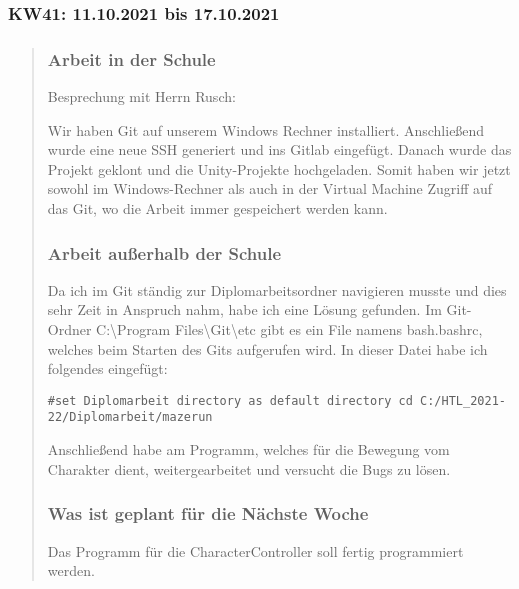 

\subsubsection{KW41: 11.10.2021 bis 17.10.2021}

\begin{quote}
	\subsubsection*{Arbeit in der Schule}
	
	Besprechung mit Herrn Rusch:
	
	Wir haben Git auf unserem Windows Rechner installiert. Anschließend
	wurde eine neue SSH generiert und ins Gitlab eingefügt. Danach wurde das
	Projekt geklont und die Unity-Projekte hochgeladen. Somit haben wir
	jetzt sowohl im Windows-Rechner als auch in der Virtual Machine Zugriff
	auf das Git, wo die Arbeit immer gespeichert werden kann.
	
	
	\subsubsection*{Arbeit außerhalb der
	Schule}
	
	Da ich im Git ständig zur Diplomarbeitsordner navigieren musste und dies
	sehr Zeit in Anspruch nahm, habe ich eine Lösung gefunden. Im
	Git-Ordner C:\textbackslash Program
	Files\textbackslash Git\textbackslash etc gibt es ein File namens
	bash.bashrc, welches beim Starten des Gits aufgerufen wird. In dieser
	Datei habe ich folgendes eingefügt:
	
	\texttt{\#set\ Diplomarbeit\ directory\ as\ default\ directory
	cd\ C:/HTL\_2021-22/Diplomarbeit/mazerun}
	
	Anschließend habe am Programm, welches für die Bewegung vom Charakter
	dient, weitergearbeitet und versucht die Bugs zu lösen.
	
	
	\subsubsection*{Was ist geplant für die Nächste
	Woche}
	
	Das Programm für die CharacterController soll fertig programmiert
	werden.
\end{quote}
